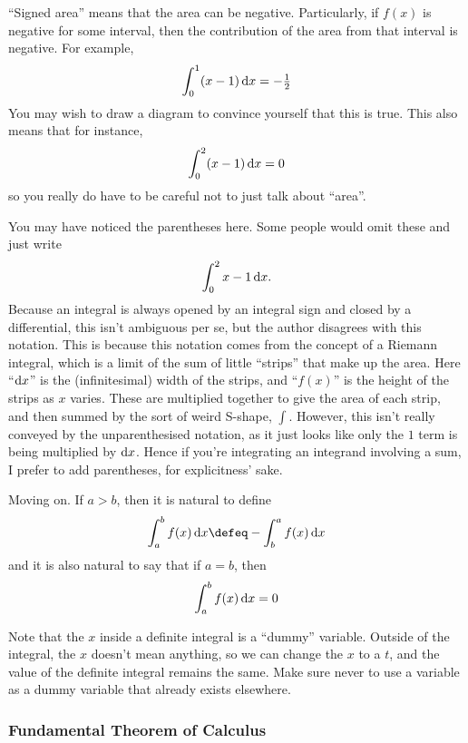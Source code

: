 ``Signed area'' means that the area can be negative. Particularly, if \(f(x)\)
is negative for some interval, then the contribution of the area from that
interval is negative. For example,
\begin{equation*}
 \integ[0]<1>{(x - 1)}{x} = -\tfrac 12
\end{equation*}
You may wish to draw a diagram to convince yourself that this is true. This also
means that for instance,
\begin{equation*}
 \integ[0]<2>{(x - 1)}{x} = 0
\end{equation*}
so you really do have to be careful not to just talk about ``area''.

You may have noticed the parentheses here. Some people would omit these and just
write
\begin{equation*}
 \integ[0]<2>{x - 1}{x}.
\end{equation*}
Because an integral is always opened by an integral sign and closed by a
differential, this isn't ambiguous per se, but the author disagrees with this
notation. This is because this notation comes from the concept of a Riemann
integral, which is a limit of the sum of little ``strips'' that make up the
area. Here ``\(\mathrm d x\)'' is the (infinitesimal) width of the strips, and
``\(f(x)\)'' is the height of the strips as \(x\) varies. These are multiplied
together to give the area of each strip, and then summed by the sort of weird
S-shape, \(\int\). However, this isn't really conveyed by the unparenthesised
notation, as it just looks like only the \(1\) term is being multiplied by
\(\mathrm d x\). Hence if you're integrating an integrand involving a sum, I prefer
to add parentheses, for explicitness' sake.

Moving on. If \(a > b\), then it is natural to define
\begin{equation*}
 \integ[a]<b>{f(x)}{x} \defeq -\integ[b]<a>{f(x)}{x}
\end{equation*}
and it is also natural to say that if \(a = b\), then
\begin{equation*}
 \integ[a]<b>{f(x)}{x} = 0
\end{equation*}

Note that the \(x\) inside a definite integral is a ``dummy'' variable. Outside
of the integral, the \(x\) doesn't mean anything, so we can change the \(x\) to
a \(t\), and the value of the definite integral remains the same. Make sure
never to use a variable as a dummy variable that already exists elsewhere.

\subsubsection*{Fundamental Theorem of Calculus}

